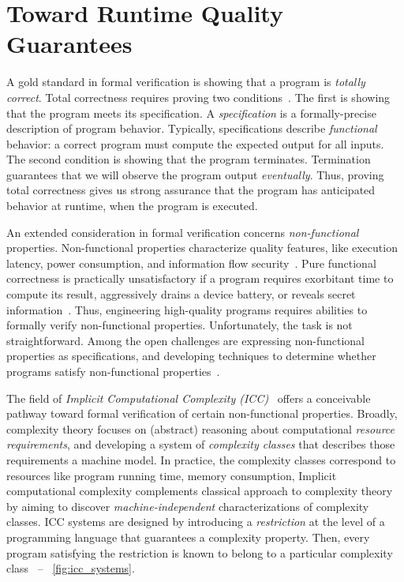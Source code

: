 \section{Toward Runtime Quality Guarantees}
\label{sec:aicc-intro}

A gold standard in formal verification is showing that a program is \emph{totally correct}.
Total correctness requires proving two conditions~\cite{leino2023}.
The first is showing that the program meets its specification.
A \emph{specification} is a formally-precise description of program behavior.
Typically, specifications describe \emph{functional} behavior:
a correct program must compute the expected output for all inputs.
The second condition is showing that the program terminates.
Termination guarantees that we will observe the program output \emph{eventually}.
Thus, proving total correctness gives us strong assurance that the program has anticipated behavior at runtime, \ie when the program is executed.

An extended consideration in formal verification concerns \emph{non-functional} properties.
Non-functional properties characterize quality features, like execution latency, power consumption, and information flow security~\cite{terbeek2018}.
Pure functional correctness is {practically unsatisfactory} if a program requires exorbitant time to compute its result, aggressively drains a device battery, or reveals secret information~\cite{heraud2011,aubert20222}.
Thus, engineering high-quality programs requires abilities to formally verify non-functional properties.
Unfortunately, the task is not straightforward.
Among the open challenges are expressing non-functional properties as specifications, and developing techniques to determine whether programs satisfy non-functional properties~\cite{etaps2025}.

The field of \emph{Implicit Computational Complexity (ICC)}~\cite{dallago2011} offers a conceivable pathway toward formal verification of certain non-functional properties.
Broadly, complexity theory focuses on (abstract) reasoning about computational \emph{resource requirements}, and developing a system of \emph{complexity classes} that describes those requirements \wrt a machine model.
In practice, the complexity classes correspond to resources like program running time, memory consumption, \etc
Implicit computational complexity complements classical approach to complexity theory by aiming to discover \emph{machine-independent} characterizations of complexity classes.
ICC systems are designed by introducing a \emph{restriction} at the level of a programming language that guarantees a complexity property.
Then, every program satisfying the restriction is known to belong to a particular complexity class~\cite{pchoux2020}  -- \cf~\autoref{fig:icc_systems}.

